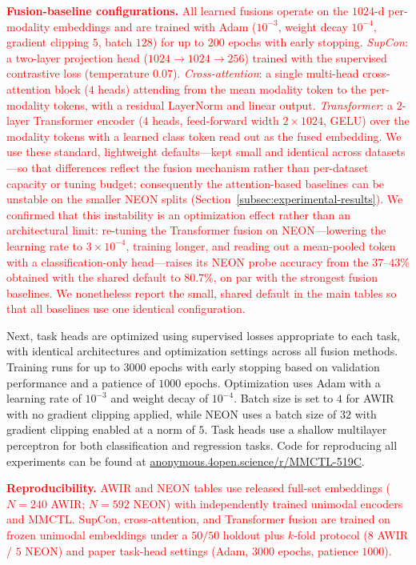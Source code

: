 \documentclass[10pt,twocolumn,letterpaper]{article}
\newcommand{\new}[1]{\textcolor{red}{#1}}
\begin{document}
\new{\noindent\textbf{Fusion-baseline configurations.} All learned fusions operate on the $1024$-d per-modality embeddings and are trained with Adam ($10^{-3}$, weight decay $10^{-4}$, gradient clipping $5$, batch $128$) for up to $200$ epochs with early stopping. \emph{SupCon}: a two-layer projection head ($1024{\to}1024{\to}256$) trained with the supervised contrastive loss (temperature $0.07$). \emph{Cross-attention}: a single multi-head cross-attention block ($4$ heads) attending from the mean modality token to the per-modality tokens, with a residual LayerNorm and linear output. \emph{Transformer}: a $2$-layer Transformer encoder ($4$ heads, feed-forward width $2{\times}1024$, GELU) over the modality tokens with a learned class token read out as the fused embedding. We use these standard, lightweight defaults---kept small and identical across datasets---so that differences reflect the fusion mechanism rather than per-dataset capacity or tuning budget; consequently the attention-based baselines can be unstable on the smaller NEON splits (Section~\ref{subsec:experimental-results}). We confirmed that this instability is an optimization effect rather than an architectural limit: re-tuning the Transformer fusion on NEON---lowering the learning rate to $3\times10^{-4}$, training longer, and reading out a mean-pooled token with a classification-only head---raises its NEON probe accuracy from the $37$--$43\%$ obtained with the shared default to $80.7\%$, on par with the strongest fusion baselines. We nonetheless report the small, shared default in the main tables so that all baselines use one identical configuration.}

Next, task heads are optimized using supervised losses appropriate to each task, with identical architectures and optimization settings across all fusion methods. Training runs for up to $3000$ epochs with early stopping based on validation performance and a patience of $1000$ epochs. Optimization uses Adam with a learning rate of $10^{-3}$ and weight decay of $10^{-4}$. Batch size is set to $4$ for AWIR with no gradient clipping applied, while NEON uses a batch size of $32$ with gradient clipping enabled at a norm of $5$. Task heads use a shallow multilayer perceptron for both classification and regression tasks. Code for reproducing all experiments can be found at
\href{https://anonymous.4open.science/r/MMCTL-519C/}{anonymous.4open.science/r/MMCTL-519C}.

\new{\noindent\textbf{Reproducibility.} AWIR and NEON tables use released full-set embeddings ($N{=}240$ AWIR; $N{=}592$ NEON) with independently trained unimodal encoders and MMCTL. SupCon, cross-attention, and Transformer fusion are trained on frozen unimodal embeddings under a $50/50$ holdout plus $k$-fold protocol ($8$ AWIR / $5$ NEON) and paper task-head settings (Adam, $3000$ epochs, patience $1000$).}
\end{document}
